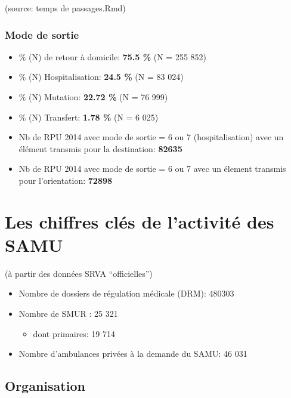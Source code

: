 \documentclass[]{article}
\begin{document}
(source: temps de passages.Rmd)

\subsubsection{Mode de sortie}\label{mode-de-sortie}

\begin{itemize}
\itemsep1pt\parskip0pt
\item
  \% (N) de retour à domicile: \textbf{75.5 \%} (N = 255 852)
\item
  \% (N) Hospitalisation: \textbf{24.5 \%} (N = 83 024)
\item
  \% (N) Mutation: \textbf{22.72 \%} (N = 76 999)
\item
  \% (N) Transfert: \textbf{1.78 \%} (N = 6 025)
\item
  Nb de RPU 2014 avec mode de sortie = 6 ou 7 (hospitalisation) avec un
  élément transmis pour la destination: \textbf{82635}
\item
  Nb de RPU 2014 avec mode de sortie = 6 ou 7 avec un élement transmis
  pour l'orientation: \textbf{72898}
\end{itemize}

\section{Les chiffres clés de l'activité des
SAMU}\label{les-chiffres-cles-de-lactivite-des-samu}

(à partir des données SRVA ``officielles'')

\begin{itemize}
\itemsep1pt\parskip0pt
\item
  Nombre de dossiers de régulation médicale (DRM): 480303
\item
  Nombre de SMUR : 25 321

  \begin{itemize}
  \itemsep1pt\parskip0pt
  \item
    dont primaires: 19 714
  \end{itemize}
\item
  Nombre d'ambulances privées à la demande du SAMU: 46 031
\end{itemize}

\subsection{Organisation}\label{organisation}
\end{document}
